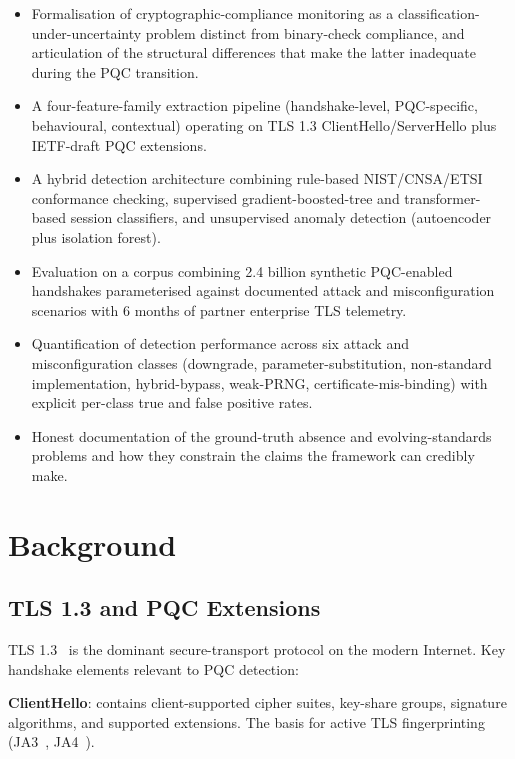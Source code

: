 \documentclass[sigconf,nonacm]{acmart}
\begin{document}
\begin{itemize}
  \item Formalisation of cryptographic-compliance monitoring as a
        classification-under-uncertainty problem distinct from
        binary-check compliance, and articulation of the structural
        differences that make the latter inadequate during the PQC
        transition.
  \item A four-feature-family extraction pipeline (handshake-level,
        PQC-specific, behavioural, contextual) operating on TLS 1.3
        ClientHello/ServerHello plus IETF-draft PQC extensions.
  \item A hybrid detection architecture combining rule-based
        NIST/CNSA/ETSI conformance checking, supervised
        gradient-boosted-tree and transformer-based session
        classifiers, and unsupervised anomaly detection (autoencoder
        plus isolation forest).
  \item Evaluation on a corpus combining 2.4 billion synthetic
        PQC-enabled handshakes parameterised against documented
        attack and misconfiguration scenarios with 6 months of
        partner enterprise TLS telemetry.
  \item Quantification of detection performance across six attack
        and misconfiguration classes (downgrade, parameter-substitution,
        non-standard implementation, hybrid-bypass, weak-PRNG,
        certificate-mis-binding) with explicit per-class true and
        false positive rates.
  \item Honest documentation of the ground-truth absence and
        evolving-standards problems and how they constrain the
        claims the framework can credibly make.
\end{itemize}

\section{Background}

\subsection{TLS 1.3 and PQC Extensions}

TLS 1.3~\cite{rfc8446} is the dominant secure-transport protocol on
the modern Internet. Key handshake elements relevant to PQC
detection:

\textbf{ClientHello}: contains client-supported cipher suites,
key-share groups, signature algorithms, and supported extensions.
The basis for active TLS fingerprinting (JA3~\cite{althouse2017ja3},
JA4~\cite{salesforce2024ja4}).
\end{document}
